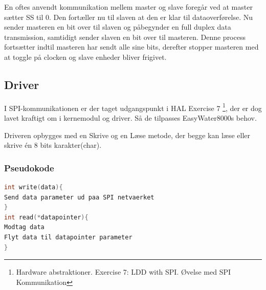 En oftes anvendt kommunikation mellem master og slave foregår ved at master sætter SS til 0. Den fortæller nu til slaven at den er klar til 
dataoverførelse. Nu sender masteren en bit over til slaven og påbegynder en full duplex data transmission, samtidigt sender slaven en bit over
til masteren. Denne process fortsætter indtil masteren har sendt alle sine bits, derefter stopper masteren med at toggle på clocken og slave 
enheder bliver frigivet.

\subsection{Driver}

I SPI-kommunikationen er der taget udgangspunkt i HAL Exercise 7 \footnote{Hardware abstraktioner. Exercise 7: LDD with SPI. Øvelse med SPI Kommunikation}, der er dog lavet kraftigt om i kernemodul og driver. Så de tilpasses EasyWater8000s behov.

Driveren opbygges med en Skrive og en Læse metode, der begge kan læse eller skrive én 8 bits karakter(char).

\subsubsection*{Pseudokode}

\begin{lstlisting}[language=C]
int write(data){
Send data parameter ud paa SPI netvaerket
}
int read(*datapointer){
Modtag data
Flyt data til datapointer parameter
}
\end{lstlisting}